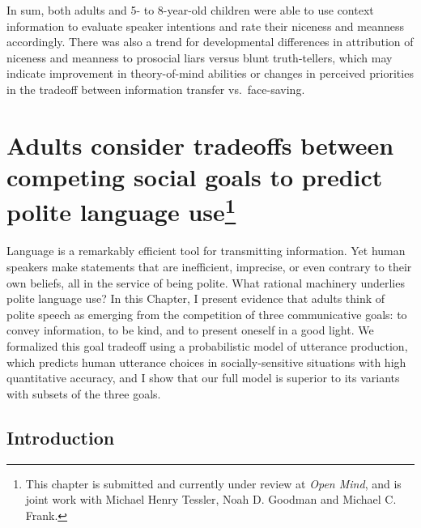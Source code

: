 \documentclass[oneside]{report}
\begin{document}
In sum, both adults and 5- to 8-year-old children were able to use
context information to evaluate speaker intentions and rate their
niceness and meanness accordingly. There was also a trend for
developmental differences in attribution of niceness and meanness to
prosocial liars versus blunt truth-tellers, which may indicate
improvement in theory-of-mind abilities or changes in perceived
priorities in the tradeoff between information transfer vs.~face-saving.

\chapter[Adults consider tradeoffs between competing social goals to
predict polite language use]{\texorpdfstring{Adults consider tradeoffs
between competing social goals to predict polite language use\footnote{This
  chapter is submitted and currently under review at \emph{Open Mind},
  and is joint work with Michael Henry Tessler, Noah D. Goodman and
  Michael C. Frank.}}{Adults consider tradeoffs between competing social goals to predict polite language use}}\label{adults-consider-tradeoffs-between-competing-social-goals-to-predict-polite-language-use}


Language is a remarkably efficient tool for transmitting information.
Yet human speakers make statements that are inefficient, imprecise, or
even contrary to their own beliefs, all in the service of being polite.
What rational machinery underlies polite language use? In this Chapter,
I present evidence that adults think of polite speech as emerging from
the competition of three communicative goals: to convey information, to
be kind, and to present oneself in a good light. We formalized this goal
tradeoff using a probabilistic model of utterance production, which
predicts human utterance choices in socially-sensitive situations with
high quantitative accuracy, and I show that our full model is superior
to its variants with subsets of the three goals.

\section{Introduction}\label{introduction-3}
\end{document}
